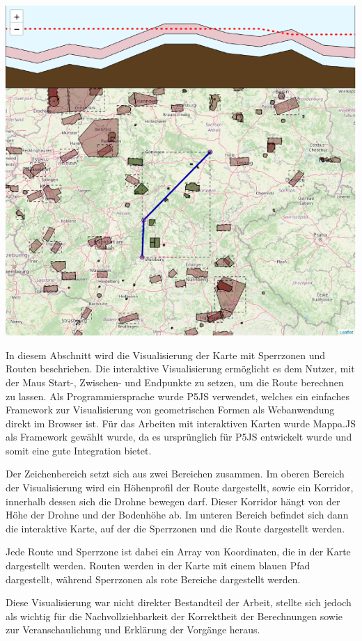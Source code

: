 \begin{center}
    \includegraphics[width=\columnwidth]{images/final-map-with-routing-and-height-profile}
    \label{fig:REPLACE}
\end{center}

In diesem Abschnitt wird die Visualisierung der Karte mit Sperrzonen und Routen beschrieben. Die interaktive Visualisierung ermöglicht es dem Nutzer, mit der Maus Start-, Zwischen- und Endpunkte zu setzen, um die Route berechnen zu lassen. Als Programmiersprache wurde P5JS verwendet, welches ein einfaches Framework zur Visualisierung von geometrischen Formen als Webanwendung direkt im Browser ist. Für das Arbeiten mit interaktiven Karten wurde Mappa.JS als Framework gewählt wurde, da es ursprünglich für P5JS entwickelt wurde und somit eine gute Integration bietet.

Der Zeichenbereich setzt sich aus zwei Bereichen zusammen.
Im oberen Bereich der Visualisierung wird ein Höhenprofil der Route dargestellt, sowie ein Korridor, innerhalb dessen sich die Drohne bewegen darf. Dieser Korridor hängt von der Höhe der Drohne und der Bodenhöhe ab.
Im unteren Bereich befindet sich dann die interaktive Karte, auf der die Sperrzonen und die Route dargestellt werden.

Jede Route und Sperrzone ist dabei ein Array von Koordinaten, die in der Karte dargestellt werden. Routen werden in der Karte mit einem blauen Pfad dargestellt, während Sperrzonen als rote Bereiche dargestellt werden.

Diese Visualisierung war nicht direkter Bestandteil der Arbeit,  stellte sich jedoch als wichtig für die Nachvollziehbarkeit der Korrektheit der Berechnungen sowie zur Veranschaulichung und Erklärung der Vorgänge heraus.